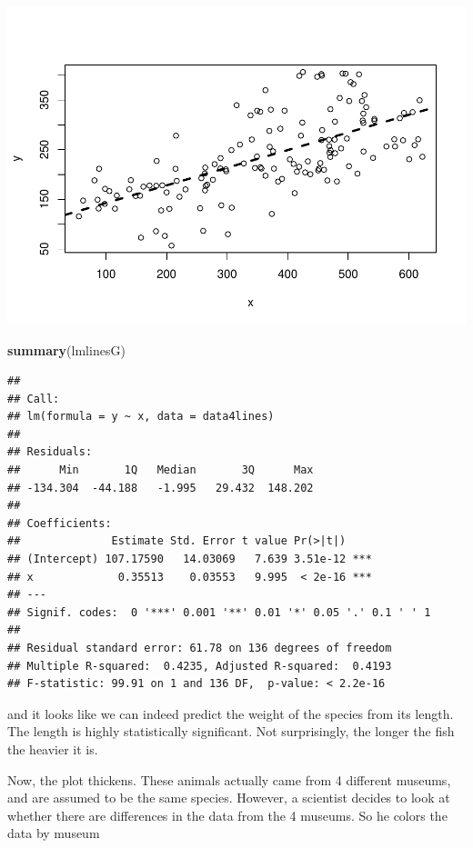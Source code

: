\documentclass[
]{book}
\newenvironment{Shaded}{\begin{snugshade}}{\end{snugshade}}
\newcommand{\FunctionTok}[1]{\textcolor[rgb]{0.13,0.29,0.53}{\textbf{#1}}}
\newcommand{\NormalTok}[1]{#1}
\begin{document}
\includegraphics{ECOMODbook_files/figure-latex/a7.10-1.pdf}

\begin{Shaded}
\begin{Highlighting}[]
\FunctionTok{summary}\NormalTok{(lmlinesG)}
\end{Highlighting}
\end{Shaded}

\begin{verbatim}
## 
## Call:
## lm(formula = y ~ x, data = data4lines)
## 
## Residuals:
##      Min       1Q   Median       3Q      Max 
## -134.304  -44.188   -1.995   29.432  148.202 
## 
## Coefficients:
##              Estimate Std. Error t value Pr(>|t|)    
## (Intercept) 107.17590   14.03069   7.639 3.51e-12 ***
## x             0.35513    0.03553   9.995  < 2e-16 ***
## ---
## Signif. codes:  0 '***' 0.001 '**' 0.01 '*' 0.05 '.' 0.1 ' ' 1
## 
## Residual standard error: 61.78 on 136 degrees of freedom
## Multiple R-squared:  0.4235, Adjusted R-squared:  0.4193 
## F-statistic: 99.91 on 1 and 136 DF,  p-value: < 2.2e-16
\end{verbatim}

and it looks like we can indeed predict the weight of the species from its length. The length is highly statistically significant. Not surprisingly, the longer the fish the heavier it is.

Now, the plot thickens. These animals actually came from 4 different museums, and are assumed to be the same species. However, a scientist decides to look at whether there are differences in the data from the 4 museums. So he colors the data by museum
\end{document}
